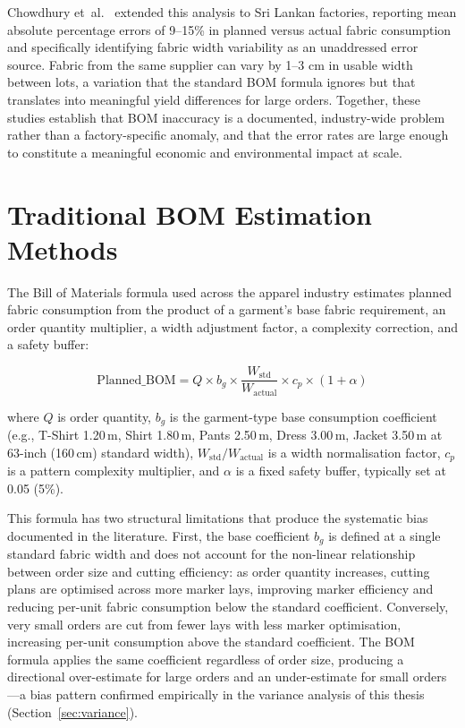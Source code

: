 Chowdhury et~al.\ \cite{chowdhury2020wastage} extended this analysis to Sri Lankan factories, reporting mean absolute percentage errors of 9--15\% in planned versus actual fabric consumption and specifically identifying fabric width variability as an unaddressed error source. Fabric from the same supplier can vary by 1--3 cm in usable width between lots, a variation that the standard BOM formula ignores but that translates into meaningful yield differences for large orders. Together, these studies establish that BOM inaccuracy is a documented, industry-wide problem rather than a factory-specific anomaly, and that the error rates are large enough to constitute a meaningful economic and environmental impact at scale.

\secdiv
\section{Traditional BOM Estimation Methods}
The Bill of Materials formula used across the apparel industry estimates planned fabric consumption from the product of a garment's base fabric requirement, an order quantity multiplier, a width adjustment factor, a complexity correction, and a safety buffer:

\begin{mdframed}[style=eqbox]
\begin{equation}
\text{Planned\_BOM} = Q \times b_g \times \frac{W_{\text{std}}}{W_{\text{actual}}} \times c_p \times (1+\alpha)\label{eq:bom}
\end{equation}
\end{mdframed}

\noindent where $Q$ is order quantity, $b_g$ is the garment-type base consumption coefficient (e.g., T-Shirt 1.20\,m, Shirt 1.80\,m, Pants 2.50\,m, Dress 3.00\,m, Jacket 3.50\,m at 63-inch (160\,cm) standard width), $W_{\text{std}}/W_{\text{actual}}$ is a width normalisation factor, $c_p$ is a pattern complexity multiplier, and $\alpha$ is a fixed safety buffer, typically set at 0.05 (5\%).

This formula has two structural limitations that produce the systematic bias documented in the literature. First, the base coefficient $b_g$ is defined at a single standard fabric width and does not account for the non-linear relationship between order size and cutting efficiency: as order quantity increases, cutting plans are optimised across more marker lays, improving marker efficiency and reducing per-unit fabric consumption below the standard coefficient. Conversely, very small orders are cut from fewer lays with less marker optimisation, increasing per-unit consumption above the standard coefficient. The BOM formula applies the same coefficient regardless of order size, producing a directional over-estimate for large orders and an under-estimate for small orders---a bias pattern confirmed empirically in the variance analysis of this thesis (Section~\ref{sec:variance}).

